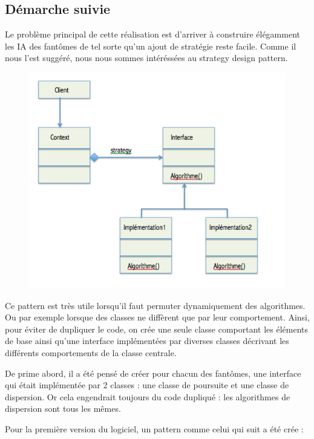 \documentclass[a4paper,12pt]{report} %
\begin{document}
\subsection{Démarche suivie}

Le problème principal de cette réalisation est d'arriver à construire élégamment les IA des fantômes de tel sorte qu'un ajout de stratégie reste facile.
Comme il nous l'est suggéré, nous nous sommes intéréssées au strategy design pattern.

\begin{figure}[!h] %
		\centering
		\includegraphics[scale=0.7]{ressources/StrategyDesignPattern.png}
\end{figure} 



Ce pattern est très utile lorsqu'il faut permuter dynamiquement des algorithmes.
Ou par exemple lorsque des classes ne diffèrent que par leur comportement. Ainsi, pour éviter de dupliquer le code, on crée une seule classe comportant les éléments de base ainsi qu'une interface implémentées par diverses classes décrivant les différents comportements de la classe centrale.

De prime abord, il a été pensé de créer pour chacun des fantômes, une interface qui était implémentée par 2 classes : une classe de poursuite et une classe de dispersion.
Or cela engendrait toujours du code dupliqué : les algorithmes de dispersion sont tous les mêmes.

Pour la première version du logiciel, un pattern comme celui qui suit a été crée :
\end{document}
